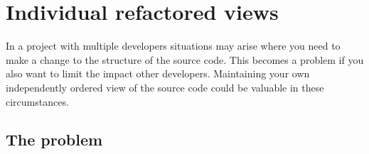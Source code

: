 
\chapter{Individual refactored views}

In a project with multiple developers situations may arise where you need to make a change to the structure of the source code. This becomes a problem if you also want to limit the impact other developers.  Maintaining your own independently ordered view of the source code could be valuable in these circumstances. 

\section{The problem}
